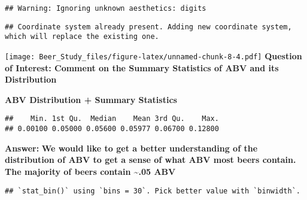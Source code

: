 \documentclass[
]{article}
\newenvironment{Shaded}{\begin{snugshade}}{\end{snugshade}}
\newcommand{\DataTypeTok}[1]{\textcolor[rgb]{0.13,0.29,0.53}{#1}}
\newcommand{\KeywordTok}[1]{\textcolor[rgb]{0.13,0.29,0.53}{\textbf{#1}}}
\newcommand{\NormalTok}[1]{#1}
\newcommand{\OperatorTok}[1]{\textcolor[rgb]{0.81,0.36,0.00}{\textbf{#1}}}
\newcommand{\StringTok}[1]{\textcolor[rgb]{0.31,0.60,0.02}{#1}}
\begin{document}
\begin{verbatim}
## Warning: Ignoring unknown aesthetics: digits
\end{verbatim}

\begin{verbatim}
## Coordinate system already present. Adding new coordinate system, which will replace the existing one.
\end{verbatim}

\texttt{[image: Beer\_Study\_files/figure-latex/unnamed-chunk-8-4.pdf]}
\textbf{Question of Interest: Comment on the Summary Statistics of ABV
and its Distribution}

\textbf{ABV Distribution + Summary Statistics}

\begin{Shaded}
\end{Shaded}

\begin{verbatim}
##    Min. 1st Qu.  Median    Mean 3rd Qu.    Max. 
## 0.00100 0.05000 0.05600 0.05977 0.06700 0.12800
\end{verbatim}

\textbf{Answer:} \textbf{We would like to get a better understanding of
the distribution of ABV to get a sense of what ABV most beers contain.
The majority of beers contain \textasciitilde.05 ABV}

\begin{Shaded}
\end{Shaded}

\begin{verbatim}
## `stat_bin()` using `bins = 30`. Pick better value with `binwidth`.
\end{verbatim}
\end{document}

